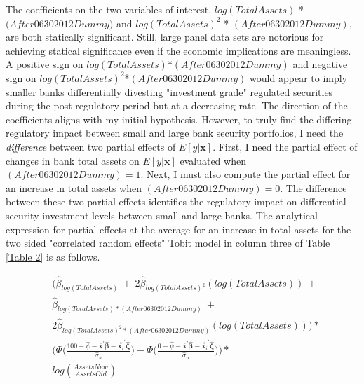 \documentclass[preprint,12pt]{elsarticle}
\begin{document}
The coefficients on the two variables of interest, $log(TotalAssets)$ * \\ $(After$$06302012$$Dummy)$ and $log(TotalAssets)^{2}$ * $(After06302012Dummy)$, are both statically significant.  Still, large panel data sets are notorious for achieving statical significance even if the economic implications are meaningless.  A positive sign on $log(TotalAssets)$*$(After06302012Dummy)$ and negative sign on $log(TotalAssets)^{2}$*$(After06302012Dummy)$ would appear to imply smaller banks differentially divesting "investment grade" regulated securities during the post regulatory period but at a decreasing rate.  The direction of the coefficients aligns with my initial hypothesis.  However, to truly find the differing regulatory impact between small and large bank security portfolios, I need the \textit{difference} between two partial effects of $E[y|\bm{x}]$.  First, I need the partial effect of changes in bank total assets on $E[y|\bm{x}]$ evaluated when $(After06302012Dummy)=1$.  Next, I must also compute the partial effect for an increase in total assets when $(After06302012Dummy)=0$.  The difference between these two partial effects identifies the regulatory impact on differential security investment levels between small and large banks. The analytical expression for partial effects at the average for an increase in total assets for the two sided "correlated random effects" Tobit model in column three of Table \ref{Table 2} is as follows.

\begin{align*}
& \bigg( \hat{\beta}_{log(TotalAssets)} \ + \ 2\hat{\beta}_{log(TotalAssets)^{2}}(log(TotalAssets)) \ + \\ 
& \hat{\beta}_{log(TotalAssets)*(After06302012Dummy)} \ + \\ 
& 2\hat{\beta}_{log(TotalAssets)^{2}*(After06302012Dummy)}(log(TotalAssets))\bigg) * \\ 
& \bigg( \Phi \Big(\frac{100 -  \hat{\psi} - \overline{\bm{x}}^{'}\hat{\bm{\beta}} - \overline{\overline{\bm{x}_{i}}}^{'}\hat{\bm{\zeta}}}{\hat{\sigma}_{u}} \Big) -  \Phi \Big(\frac{0 -  \hat{\psi} - \overline{\bm{x}}^{'}\hat{\bm{\beta}} - \overline{\overline{\bm{x}_{i}}}^{'}\hat{\bm{\zeta}}}{\hat{\sigma}_{u}} \Big) \bigg) * \\
& log(\frac{AssetsNew}{AssetsOld}) \\ 
&
\end{align*}
\end{document}

